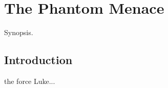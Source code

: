 \chapter{The Phantom Menace}
	\label{chapter:phantom-menace}%



\begin{synopsis}
	Synopsis.
\end{synopsis}


\section{Introduction}

 the force Luke...

